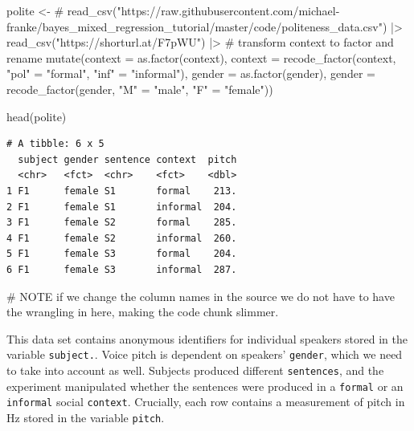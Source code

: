 \documentclass[
  doc,
  floatsintext,
  longtable,
  nolmodern,
  notxfonts,
  notimes,
  colorlinks=true,linkcolor=blue,citecolor=blue,urlcolor=blue]{apa7}
\newenvironment{Shaded}{\begin{snugshade}}{\end{snugshade}}
\newcommand{\AlertTok}[1]{\textcolor[rgb]{0.68,0.00,0.00}{#1}}
\newcommand{\AttributeTok}[1]{\textcolor[rgb]{0.40,0.45,0.13}{#1}}
\newcommand{\CommentTok}[1]{\textcolor[rgb]{0.37,0.37,0.37}{#1}}
\newcommand{\FunctionTok}[1]{\textcolor[rgb]{0.28,0.35,0.67}{#1}}
\newcommand{\NormalTok}[1]{\textcolor[rgb]{0.00,0.23,0.31}{#1}}
\newcommand{\OtherTok}[1]{\textcolor[rgb]{0.00,0.23,0.31}{#1}}
\newcommand{\SpecialCharTok}[1]{\textcolor[rgb]{0.37,0.37,0.37}{#1}}
\newcommand{\StringTok}[1]{\textcolor[rgb]{0.13,0.47,0.30}{#1}}
\begin{document}
\begin{Shaded}
\begin{Highlighting}[]
\NormalTok{polite }\OtherTok{\textless{}{-}} 
  \CommentTok{\# read\_csv("https://raw.githubusercontent.com/michael{-}franke/bayes\_mixed\_regression\_tutorial/master/code/politeness\_data.csv") |\textgreater{} }
  \FunctionTok{read\_csv}\NormalTok{(}\StringTok{"https://shorturl.at/F7pWU"}\NormalTok{) }\SpecialCharTok{|\textgreater{}} 
  \CommentTok{\# transform context to factor and rename}
  \FunctionTok{mutate}\NormalTok{(}\AttributeTok{context =} \FunctionTok{as.factor}\NormalTok{(context),}
         \AttributeTok{context =} \FunctionTok{recode\_factor}\NormalTok{(context,}
                                 \StringTok{"pol"} \OtherTok{=} \StringTok{"formal"}\NormalTok{,}
                                 \StringTok{"inf"} \OtherTok{=} \StringTok{"informal"}\NormalTok{),}
         \AttributeTok{gender =} \FunctionTok{as.factor}\NormalTok{(gender),}
         \AttributeTok{gender =} \FunctionTok{recode\_factor}\NormalTok{(gender,}
                                \StringTok{"M"} \OtherTok{=} \StringTok{"male"}\NormalTok{,}
                                \StringTok{"F"} \OtherTok{=} \StringTok{"female"}\NormalTok{))}

\FunctionTok{head}\NormalTok{(polite)}
\end{Highlighting}
\end{Shaded}

\begin{verbatim}
# A tibble: 6 x 5
  subject gender sentence context  pitch
  <chr>   <fct>  <chr>    <fct>    <dbl>
1 F1      female S1       formal    213.
2 F1      female S1       informal  204.
3 F1      female S2       formal    285.
4 F1      female S2       informal  260.
5 F1      female S3       formal    204.
6 F1      female S3       informal  287.
\end{verbatim}

\begin{Shaded}
\begin{Highlighting}[]
\CommentTok{\# }\AlertTok{NOTE}\CommentTok{  if we change the column names in the source we do not have to have the wrangling in here, making the code  chunk slimmer.}
\end{Highlighting}
\end{Shaded}

This data set contains anonymous identifiers for individual speakers
stored in the variable \texttt{subject.}. Voice pitch is dependent on
speakers' \texttt{gender}, which we need to take into account as well.
Subjects produced diﬀerent \texttt{sentences}, and the experiment
manipulated whether the sentences were produced in a \texttt{formal} or
an \texttt{informal} social \texttt{context}. Crucially, each row
contains a measurement of pitch in Hz stored in the variable
\texttt{pitch}.
\end{document}
